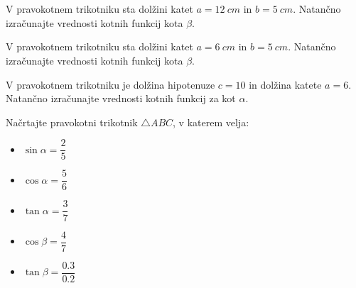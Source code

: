             ~\\~\\

        



        
            \begin{naloga}
                V pravokotnem trikotniku sta dolžini katet $a=12~cm$ in $b=5~cm$. 
                Natančno izračunajte vrednosti kotnih funkcij kota $\beta$.
            \end{naloga}


            \begin{naloga}
                V pravokotnem trikotniku sta dolžini katet $a=6~cm$ in $b=5~cm$. 
                Natančno izračunajte vrednosti kotnih funkcij kota $\beta$.
            \end{naloga}


            \begin{naloga}
                V pravokotnem trikotniku je dolžina hipotenuze $c=10$ in dolžina katete $a=6$. 
                Natančno izračunajte vrednosti kotnih funkcij za kot $\alpha$.
            \end{naloga}

        


        
            \begin{naloga}
                Načrtajte pravokotni trikotnik $\triangle ABC$, v katerem velja:
                \begin{multicols}{2}
                \begin{itemize}
                    \item $\displaystyle \sin\alpha=\dfrac{2}{5}$ 
                    \item $\displaystyle \cos\alpha=\dfrac{5}{6}$ 
                    \item $\displaystyle \tan\alpha=\dfrac{3}{7}$ 
                    \item $\displaystyle \cos\beta=\dfrac{4}{7}$ 
                    \item $\displaystyle \tan\beta=\dfrac{0.3}{0.2}$ 
                \end{itemize}
            \end{multicols}
            \end{naloga}

        



\newpage
